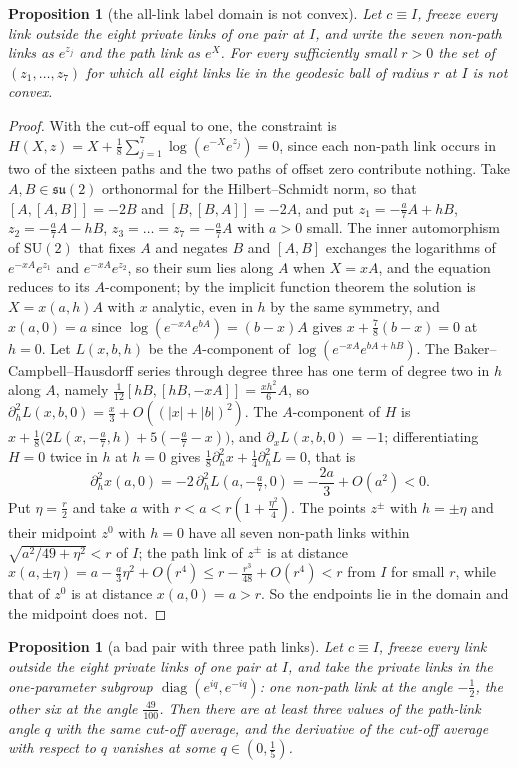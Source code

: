 \documentclass[11pt]{amsart}
\newtheorem{proposition}[theorem]{Proposition}
\theoremstyle{definition}
\theoremstyle{remark}
\numberwithin{equation}{section}
\newcommand{\SU}{\mathrm{SU}}
\begin{document}
\begin{proposition}[the all-link label domain is not convex]\label{prop:nonconvex}
Let $c\equiv I$, freeze every link outside the eight private links of one
pair at $I$, and write the seven non-path links as $e^{z_j}$ and the path
link as $e^{X}$. For every sufficiently small $r>0$ the set of
$(z_1,\dots,z_7)$ for which all eight links lie in the geodesic ball of
radius $r$ at $I$ is not convex.
\end{proposition}

\begin{proof}
With the cut-off equal to one, the constraint is $H(X,z)=X+\frac18\sum_{j
=1}^7\log(e^{-X}e^{z_j})=0$, since each non-path link occurs in two of the
sixteen paths and the two paths of offset zero contribute nothing. Take
$A,B\in\mathfrak{su}(2)$ orthonormal for the Hilbert--Schmidt norm, so
that $[A,[A,B]]=-2B$ and $[B,[B,A]]=-2A$, and put $z_1=-\frac a7A+hB$,
$z_2=-\frac a7A-hB$, $z_3=\dots=z_7=-\frac a7A$ with $a>0$ small. The inner automorphism of $\SU(2)$ that fixes $A$ and negates $B$ and
$[A,B]$ exchanges the logarithms of $e^{-xA}e^{z_1}$ and $e^{-xA}e^{z_2}$,
so their sum lies along $A$ when $X=xA$, and the equation reduces to its
$A$-component; by the implicit function theorem the solution is $X=x(a,h)A$
with $x$ analytic, even in $h$ by the same symmetry, and $x(a,0)=a$ since
$\log(e^{-xA}e^{bA})=(b-x)A$ gives $x+\frac78(b-x)=0$ at $h=0$. Let $L(x,b,h)$ be the $A$-component of $\log(e^{-xA}
e^{bA+hB})$. The Baker--Campbell--Hausdorff series through degree three
has one term of degree two in $h$ along $A$, namely $\frac1{12}[hB,[hB,
-xA]]=\frac{xh^2}6A$, so $\partial_h^2L(x,b,0)=\frac x3+O((|x|+|b|)^2)$.
The $A$-component of $H$ is $x+\frac18\bigl(2L(x,-\frac a7,h)+5(-\frac a7
-x)\bigr)$, and $\partial_xL(x,b,0)=-1$; differentiating $H=0$ twice in
$h$ at $h=0$ gives $\frac18\partial_h^2x+\frac14\partial_h^2L=0$, that is
\[
\partial_h^2x(a,0)=-2\,\partial_h^2L(a,-\tfrac a7,0)=-\frac{2a}3+O(a^2)<0 .
\]
Put $\eta=\frac r2$ and take $a$ with $r<a<r(1+\frac{\eta^2}{4})$. The
points $z^\pm$ with $h=\pm\eta$ and their midpoint $z^0$ with $h=0$ have
all seven non-path links within $\sqrt{a^2/49+\eta^2}<r$ of $I$; the path
link of $z^\pm$ is at distance $x(a,\pm\eta)=a-\frac a3\eta^2+O(r^4)\le
r-\frac{r^3}{48}+O(r^4)<r$ from $I$ for small $r$, while that of $z^0$ is
at distance
$x(a,0)=a>r$. So the endpoints lie in the domain and the midpoint does
not.
\end{proof}

\begin{proposition}[a bad pair with three path links]\label{prop:branches}
Let $c\equiv I$, freeze every link outside the eight private links of one
pair at $I$, and take the private links in the one-parameter subgroup
$\operatorname{diag}(e^{iq},e^{-iq})$: one non-path link at the angle
$-\frac12$, the other six at the angle $\frac{49}{100}$. Then there are at
least three values of the path-link angle $q$ with the same cut-off
average, and the derivative of the cut-off average with respect to $q$
vanishes at some $q\in(0,\frac15)$.
\end{proposition}
\end{document}
